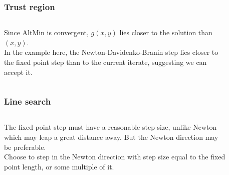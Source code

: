 \documentclass{beamer}
\begin{document}
\begin{frame}
\frametitle{Trust region}

\begin{columns}
	\begin{column}{0.5\textwidth}
		Since AltMin is convergent, $g(x,y)$ lies closer to the solution than $(x,y)$.
		\\
		\vspace{1em}
		In the example here, the Newton-Davidenko-Branin step lies closer to the fixed point step than to the current iterate, suggesting we can accept it.
	\end{column}
	\begin{column}{0.5\textwidth}
		\begin{figure}
		\end{figure}
	\end{column}
\end{columns}

\end{frame}

\begin{frame}
\frametitle{Line search}

\begin{columns}
	\begin{column}{0.5\textwidth}
		The fixed point step must have a reasonable step size, unlike Newton which may leap a great distance away.
		But the Newton direction may be preferable.
		\\
		\vspace{1em}
		Choose to step in the Newton direction with step size equal to the fixed point length, or some multiple of it.
	\end{column}
	\begin{column}{0.5\textwidth}
		\begin{figure}
		\end{figure}
	\end{column}
\end{columns}

\end{frame}
\end{document}
